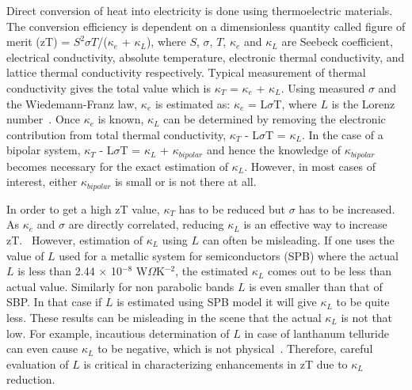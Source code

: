 \documentclass[%
 aip,
 amsmath,amssymb,
reprint, onecolumn %
]{revtex4-1}
\begin{document}


Direct conversion of heat into electricity is done using thermoelectric materials. The conversion efficiency is dependent on a dimensionless quantity called figure of merit (zT) = $S^2\sigma T$/($\kappa_e$ + $\kappa_L$), where $S$, $\sigma$, $T$, $\kappa_e$ and $\kappa_L$ are Seebeck coefficient, electrical conductivity, absolute temperature, electronic thermal conductivity, and lattice thermal conductivity respectively. Typical measurement of thermal conductivity gives the total value which is $\kappa_T$ = $\kappa_e$ + $\kappa_L$. Using measured $\sigma$ and the Wiedemann-Franz law, $\kappa_e$ is estimated as: $\kappa_e$ = L$\sigma$T, where $L$ is the Lorenz number~\cite{jones1985theoretical}. Once $\kappa_e$ is known, $\kappa_L$ can be determined by removing the electronic contribution from total thermal conductivity, $\kappa_T$ - L$\sigma$T = $\kappa_L$. In the case of a bipolar system, $\kappa_T$  - L$\sigma$T = $\kappa_L$ + $\kappa_{bipolar}$ and hence the knowledge of $\kappa_{bipolar}$ becomes necessary for the exact estimation of $\kappa_L$. However, in most cases of interest, either $\kappa_{bipolar}$ is small or is not there at all.

In order to get a high zT value, $\kappa_T$ has to be reduced but $\sigma$ has to be increased. As $\kappa_e$ and $\sigma$ are directly correlated, reducing $\kappa_L$ is an effective way to increase zT.~\cite{snyder2008complex} However, estimation of $\kappa_L$ using $L$ can often be misleading. If one uses the value of $L$ used for a metallic system for semiconductors (SPB) where the actual $L$ is less than 2.44 $\times$ 10$^{-8}$ W$\Omega$K$^{-2}$, the estimated $\kappa_L$ comes out to be less than actual value. Similarly for non parabolic bands $L$ is even smaller than that of SBP.  In that case if $L$ is estimated using SPB model it will give $\kappa_L$ to be quite less. These results can be misleading in the scene that the actual $\kappa_L$ is not that low. For example, incautious determination of $L$ in case of lanthanum telluride can even cause $\kappa_L$ to be negative, which is not physical~\cite{may2008thermoelectric}. Therefore, careful evaluation of $L$ is critical in characterizing enhancements in zT due to $\kappa_L$ reduction. 
\end{document}
